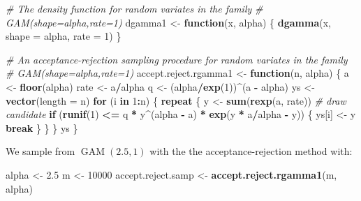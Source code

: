 \documentclass[
  11pt,
]{paper}
\newenvironment{Shaded}{\begin{snugshade}}{\end{snugshade}}
\newcommand{\AttributeTok}[1]{\textcolor[rgb]{0.13,0.29,0.53}{#1}}
\newcommand{\CommentTok}[1]{\textcolor[rgb]{0.56,0.35,0.01}{\textit{#1}}}
\newcommand{\ControlFlowTok}[1]{\textcolor[rgb]{0.13,0.29,0.53}{\textbf{#1}}}
\newcommand{\DecValTok}[1]{\textcolor[rgb]{0.00,0.00,0.81}{#1}}
\newcommand{\FloatTok}[1]{\textcolor[rgb]{0.00,0.00,0.81}{#1}}
\newcommand{\FunctionTok}[1]{\textcolor[rgb]{0.13,0.29,0.53}{\textbf{#1}}}
\newcommand{\NormalTok}[1]{#1}
\newcommand{\OtherTok}[1]{\textcolor[rgb]{0.56,0.35,0.01}{#1}}
\newcommand{\SpecialCharTok}[1]{\textcolor[rgb]{0.81,0.36,0.00}{\textbf{#1}}}
\begin{document}
\begin{Shaded}
\begin{Highlighting}[]
\CommentTok{\# The density function for random variates in the family}
\CommentTok{\# GAM(shape=alpha,rate=1)}
\NormalTok{dgamma1 }\OtherTok{\textless{}{-}} \ControlFlowTok{function}\NormalTok{(x, alpha) \{}
    \FunctionTok{dgamma}\NormalTok{(x, }\AttributeTok{shape =}\NormalTok{ alpha, }\AttributeTok{rate =} \DecValTok{1}\NormalTok{)}
\NormalTok{\}}

\CommentTok{\# An acceptance{-}rejection sampling procedure for random variates in the family}
\CommentTok{\# GAM(shape=alpha,rate=1)}
\NormalTok{accept.reject.rgamma1 }\OtherTok{\textless{}{-}} \ControlFlowTok{function}\NormalTok{(n, alpha) \{}
\NormalTok{    a }\OtherTok{\textless{}{-}} \FunctionTok{floor}\NormalTok{(alpha)}
\NormalTok{    rate }\OtherTok{\textless{}{-}}\NormalTok{ a}\SpecialCharTok{/}\NormalTok{alpha}
\NormalTok{    q }\OtherTok{\textless{}{-}}\NormalTok{ (alpha}\SpecialCharTok{/}\FunctionTok{exp}\NormalTok{(}\DecValTok{1}\NormalTok{))}\SpecialCharTok{\^{}}\NormalTok{(a }\SpecialCharTok{{-}}\NormalTok{ alpha)}
\NormalTok{    ys }\OtherTok{\textless{}{-}} \FunctionTok{vector}\NormalTok{(}\AttributeTok{length =}\NormalTok{ n)}
    \ControlFlowTok{for}\NormalTok{ (i }\ControlFlowTok{in} \DecValTok{1}\SpecialCharTok{:}\NormalTok{n) \{}
        \ControlFlowTok{repeat}\NormalTok{ \{}
\NormalTok{            y }\OtherTok{\textless{}{-}} \FunctionTok{sum}\NormalTok{(}\FunctionTok{rexp}\NormalTok{(a, rate))  }\CommentTok{\# draw candidate}
            \ControlFlowTok{if}\NormalTok{ (}\FunctionTok{runif}\NormalTok{(}\DecValTok{1}\NormalTok{) }\SpecialCharTok{\textless{}=}\NormalTok{ q }\SpecialCharTok{*}\NormalTok{ y}\SpecialCharTok{\^{}}\NormalTok{(alpha }\SpecialCharTok{{-}}\NormalTok{ a) }\SpecialCharTok{*} \FunctionTok{exp}\NormalTok{(y }\SpecialCharTok{*}\NormalTok{ a}\SpecialCharTok{/}\NormalTok{alpha }\SpecialCharTok{{-}}\NormalTok{ y)) \{}
\NormalTok{                ys[i] }\OtherTok{\textless{}{-}}\NormalTok{ y}
                \ControlFlowTok{break}
\NormalTok{            \}}
\NormalTok{        \}}
\NormalTok{    \}}
\NormalTok{    ys}
\NormalTok{\}}
\end{Highlighting}
\end{Shaded}

We sample from \(\operatorname{GAM}(2.5,1)\) with the the
acceptance-rejection method with:

\begin{Shaded}
\begin{Highlighting}[]
\NormalTok{alpha }\OtherTok{\textless{}{-}} \FloatTok{2.5}
\NormalTok{m }\OtherTok{\textless{}{-}} \DecValTok{10000}
\NormalTok{accept.reject.samp }\OtherTok{\textless{}{-}} \FunctionTok{accept.reject.rgamma1}\NormalTok{(m, alpha)}
\end{Highlighting}
\end{Shaded}
\end{document}

